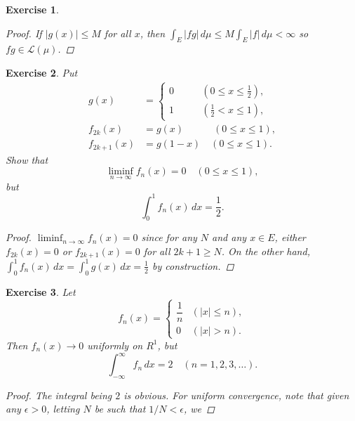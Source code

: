 \documentclass[10pt,letterpaper]{amsart}
\newtheorem{exercise}{Exercise}[section]
\theoremstyle{definition}
\theoremstyle{remark}
\numberwithin{equation}{exercise}
\begin{document}
\begin{multicols}{2}
\begin{exercise}
\begin{proof}
      If $\lvert g(x) \rvert \le M$ for all $x$,
      then $\int_E \lvert fg \rvert\,d\mu \le M\int_E \lvert
      f \rvert\,d\mu < \infty$ so $fg \in \mathscr{L}(\mu)$.
    \end{proof}
  \end{exercise}
  \begin{exercise}
    Put
    \begin{align*}
      g(x) &= \begin{cases}
        0 & \qquad(0 \le x \le \frac{1}{2}),\\
        1 & \qquad(\frac{1}{2} < x \le 1),
      \end{cases}\\
      f_{2k}(x) &= g(x) \quad\quad\quad\!\!\!(0 \le x \le 1),\\
      f_{2k+1}(x) &= g(1-x) \!\quad (0 \le x \le 1).
    \end{align*}
    Show that
    \begin{equation*}
      \liminf_{n \to \infty} f_n(x) = 0 \quad (0 \le x \le 1),
    \end{equation*}
    but
    \begin{equation*}
      \int_0^1 f_n(x)\,dx = \frac{1}{2}.
    \end{equation*}
    \begin{proof}
      $\liminf_{n \to \infty} f_n(x) = 0$ since for any $N$ and any $x \in E$,
      either $f_{2k}(x) = 0$ or $f_{2k+1}(x) = 0$ for all $2k+1 \ge N$. On the
      other hand, $\int_0^1 f_n(x)\,dx = \int_0^1 g(x)\,dx = \frac{1}{2}$ by
      construction.
    \end{proof}
  \end{exercise}
  \begin{exercise}
    Let
    \begin{equation*}
      f_n(x) = \begin{cases}
        \dfrac{1}{n} & (\lvert x \rvert \le n),\\
        0 & (\lvert x \rvert > n).
      \end{cases}
    \end{equation*}
    Then $f_n(x) \to 0$ uniformly on $R^1$, but
    \begin{equation*}
      \int_{-\infty}^\infty f_n\,dx = 2 \quad (n = 1,2,3,\ldots).
    \end{equation*}
    \begin{proof}
      The integral being $2$ is obvious. For uniform convergence, note that
      given any $\epsilon > 0$, letting $N$ be such that $1/N < \epsilon$, we

\end{proof}
\end{exercise}
\end{multicols}
\end{document}
